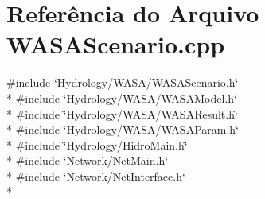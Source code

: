 \section{Referência do Arquivo W\+A\+S\+A\+Scenario.\+cpp}
\label{_w_a_s_a_scenario_8cpp}
{\ttfamily \#include \char`\"{}Hydrology/\+W\+A\+S\+A/\+W\+A\+S\+A\+Scenario.\+h\char`\"{}}\\*
{\ttfamily \#include \char`\"{}Hydrology/\+W\+A\+S\+A/\+W\+A\+S\+A\+Model.\+h\char`\"{}}\\*
{\ttfamily \#include \char`\"{}Hydrology/\+W\+A\+S\+A/\+W\+A\+S\+A\+Result.\+h\char`\"{}}\\*
{\ttfamily \#include \char`\"{}Hydrology/\+W\+A\+S\+A/\+W\+A\+S\+A\+Param.\+h\char`\"{}}\\*
{\ttfamily \#include \char`\"{}Hydrology/\+Hidro\+Main.\+h\char`\"{}}\\*
{\ttfamily \#include \char`\"{}Network/\+Net\+Main.\+h\char`\"{}}\\*
{\ttfamily \#include \char`\"{}Network/\+Net\+Interface.\+h\char`\"{}}\\*
